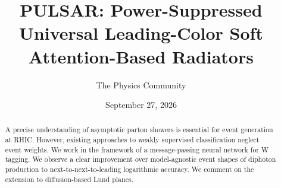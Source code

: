 \documentclass[11pt]{article}
\title{PULSAR: Power-Suppressed Universal Leading-Color Soft Attention-Based Radiators}
\author{The Physics Community}
\date{September 27, 2026}
\numberwithin{equation}{section}
\theoremstyle{definition}
\theoremstyle{remark}
\begin{document}
\maketitle
\begin{abstract}
A precise understanding of asymptotic parton showers is essential for
event generation at RHIC. However, existing approaches to weakly
supervised classification neglect event weights. We work in the
framework of a message-passing neural network for W tagging. We observe
a clear improvement over model-agnostic event shapes of diphoton
production to next-to-next-to-leading logarithmic accuracy. We comment
on the extension to diffusion-based Lund planes.
\end{abstract}
\tableofcontents





\nocite{*}


\end{document}
